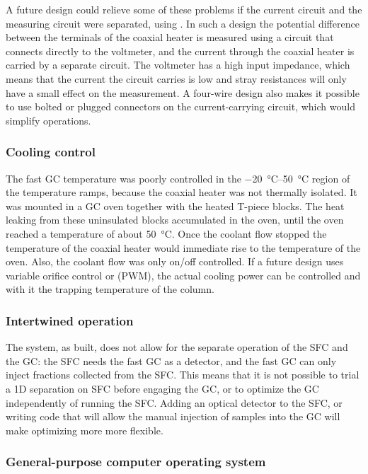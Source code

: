 A future design could relieve some of these problems if the current circuit and
the measuring circuit were separated, using . In such a design the potential difference between the terminals of
the coaxial heater is measured using a circuit that connects directly to the
voltmeter, and the current through the coaxial heater is carried by a separate
circuit. The voltmeter has a high input impedance, which means that the current
the circuit carries is low and stray resistances will only have a small effect
on the measurement. A four-wire design also makes it possible to use bolted or
plugged connectors on the current-carrying circuit, which would simplify
operations.

\subsubsection{Cooling control}

The fast GC temperature was poorly controlled in the \SIrange{-20}{50}{\celsius}
region of the temperature ramps, because the coaxial heater was not thermally
isolated. It was mounted in a GC oven together with the heated T-piece blocks.
The heat leaking from these uninsulated blocks accumulated in the oven, until
the oven reached a temperature of about \SI{50}{\celsius}. Once the coolant flow
stopped the temperature of the coaxial heater would immediate rise to the
temperature of the oven. Also, the coolant flow was only on/off controlled. If a
future design uses variable orifice control or  (PWM), the actual cooling power can be controlled and with it the
trapping temperature of the column.

\subsubsection{Intertwined operation}

The system, as built, does not allow for the separate operation of the SFC and
the GC: the SFC needs the fast GC as a detector, and the fast GC can only inject
fractions collected from the SFC. This means that it is not possible to trial a
1D separation on SFC before engaging the \twoD GC, or to optimize the GC
independently of running the SFC. Adding an optical detector to the SFC, or
writing code that will allow the manual injection of samples into the GC will
make optimizing more more flexible.

\subsubsection{General-purpose computer operating system}

